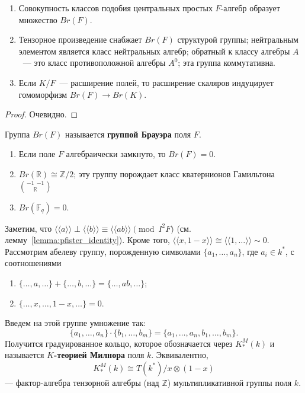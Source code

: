\documentclass[a4paper,oneside,12pt]{article}
\theoremstyle{plain} { \swapnumbers
\newtheorem{theorem}{Теорема}[subsection]
\newtheorem{corollary}[theorem]{Следствие}
\newtheorem{lemma}[theorem]{Лемма}
\newtheorem{proposition}[theorem]{Утверждение}
\newtheorem{claim}[theorem]{Факт}
}
\theoremstyle{definition} { \swapnumbers
\newtheorem{definition}[theorem]{Определение}
\newtheorem{notation}[theorem]{Обозначение}
\newtheorem{remark}[theorem]{Замечание}
\newtheorem{remarks}[theorem]{Замечания}
\newtheorem{example}[theorem]{Пример}
\newtheorem{examples}[theorem]{Примеры}
\newtheorem{sssection}[theorem]{}
}
\def\la{\langle}
\def\ra{\rangle}
\def\lla{\la\!\la}
\def\rra{\ra\!\ra}
\def\quaternion#1#2#3{\binom{{#1}\:\:{#2}}{#3}}
\begin{document}
\begin{theorem}
\begin{enumerate}
\item Совокупность классов подобия центральных простых $F$-алгебр образует множество $Br(F)$.
\item Тензорное произведение снабжает $Br(F)$ структурой группы; нейтральным элементом является
класс нейтральных алгебр; обратный к классу алгебры $A$~--- это класс противоположной алгебры $A^0$;
эта группа коммутативна.
\item Если $K/F$~--- расширение полей, то расширение скаляров индуцирует гомоморфизм $Br(F)\to Br(K)$.
\end{enumerate}
\end{theorem}
\begin{proof}
Очевидно.
\end{proof}

\begin{remark}
Группа $Br(F)$ называется {\bf группой Брауэра} поля $F$.
\end{remark}

\begin{examples}
\begin{enumerate}
\item Если поле $F$ алгебраически замкнуто, то $Br(F)=0$.
\item $Br(\mathbb R)\cong\mathbb Z/2$; эту группу порождает класс кватернионов
Гамильтона $\quaternion{-1}{-1}{\mathbb R}$
\item $Br(\mathbb F_q)=0$.
\end{enumerate}
\end{examples}

Заметим, что $\lla a\rra\perp\lla b\rra\equiv\lla ab\rra\pmod{I^2F}$
(см. лемму~\ref{lemma:pfister_identity}).
Кроме того, $\lla x,1-x\rra\cong\lla 1,\dots\rra\sim 0$.
Рассмотрим абелеву группу, порожденную символами
$\{a_1,\dots,a_n\}$, где $a_i\in k^*$, с соотношениями
\begin{enumerate}
\item $\{\dots,a,\dots\}+\{\dots,b,\dots\}=\{\dots,ab,\dots\}$;
\item $\{\dots,x,\dots,1-x,\dots\}=0$.
\end{enumerate}
Введем на этой группе умножение так:
$$
\{a_1,\dots,a_n\}\cdot\{b_1,\dots,b_m\}=\{a_1,\dots,a_n,b_1,\dots,b_m\}.
$$
Получится градуированное кольцо, которое обозначается через $K_*^M(k)$ и называется
{\bf $K$-теорией Милнора} поля $k$. Эквивалентно,
$$
K_*^M(k)\cong T(k^*)/x\otimes(1-x)
$$
--- фактор-алгебра
тензорной алгебры (над $\mathbb Z$) мультипликативной группы поля $k$.
\end{document}
